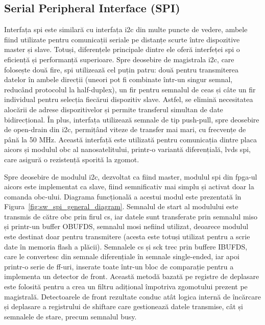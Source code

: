\documentclass[12pt,a4paper]{report}
\begin{document}
\subsection{Serial Peripheral Interface (SPI)}%
\label{spi}
Interfața \gls{spi} este similară cu interfața \gls{i2c} din multe puncte de vedere, ambele fiind utilizate pentru comunicații seriale pe distanțe scurte între dispozitive master și slave. Totuși, diferențele principale dintre ele oferă interfeței \gls{spi} o eficiență și performanță superioare. Spre deosebire de magistrala \gls{i2c}, care folosește două fire, \gls{spi} utilizează cel puțin patru: două pentru transmiterea datelor în ambele direcții (uneori pot fi combinate într-un singur semnal, reducând protocolul la half-duplex), un fir pentru semnalul de ceas și câte un fir individual pentru selecția fiecărui dispozitiv slave. Astfel, se elimină necesitatea alocării de adrese dispozitivelor și permite transferul simultan de date bidirecțional. În plus, interfața utilizează semnale de tip push-pull, spre deosebire de open-drain din \gls{i2c}, permițând viteze de transfer mai mari, cu frecvențe de până la 50 MHz. Această interfață este utilizată pentru comunicația dintre placa \gls{aicors} și modulul \gls{obc} al nanosatelitului, printr-o variantă diferențială, \gls{lvds} \gls{spi}, care asigură o rezistență sporită la zgomot.

Spre deosebire de modulul \gls{i2c}, dezvoltat ca fiind master, modulul \gls{spi} din \gls{fpga}-ul \gls{aicors} este implementat ca slave, fiind semnificativ mai simplu și activat doar la comanda \gls{obc}-ului. Diagrama funcțională a acestui modul este prezentată în Figura~\ref{fig:sw_spi_general_diagram}. Semnalul de start al modulului este transmis de către \gls{obc} prin firul \gls{cs}, iar datele sunt transferate prin semnalul \gls{miso} și printr-un buffer OBUFDS, semnalul \gls{mosi} nefiind utilizat, deoarece modulul este destinat doar pentru transmitere (acesta este totuși utilizat pentru a scrie date în memoria flash a plăcii). Semnalele \gls{cs} și \gls{sck} trec prin buffere IBUFDS, care le convertesc din semnale diferențiale în semnale single-ended, iar apoi printr-o serie de \gls{ff}-uri, inserate toate într-un bloc de comparație pentru a implementa un detector de front. Această metodă bazată pe registre de deplasare este folosită pentru a crea un filtru adițional împotriva zgomotului prezent pe magistrală. Detectoarele de front rezultate conduc atât logica internă de încărcare și deplasare a registrului de shiftare care gestionează datele transmise, cât și semnalele de stare, precum semnalul busy.
\end{document}
